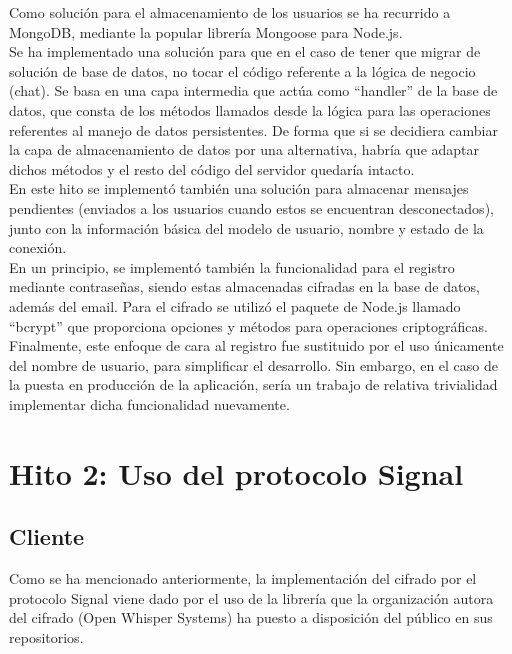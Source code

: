 Como solución para el almacenamiento de los usuarios se ha recurrido a MongoDB, mediante la popular librería Mongoose para Node.js. \\

Se ha implementado una solución para que en el caso de tener que migrar de solución de base de datos, no tocar el código referente a la lógica de negocio (chat). Se basa en una capa intermedia que actúa como \hyphenquote{spanish}{handler} de la base de datos, que consta de los métodos llamados desde la lógica para las operaciones referentes al manejo de datos persistentes. De forma que si se decidiera cambiar la capa de almacenamiento de datos por una alternativa, habría que adaptar dichos métodos y el resto del código del servidor quedaría intacto. \\ 

En este hito se implementó también una solución para almacenar mensajes pendientes (enviados a los usuarios cuando estos se encuentran desconectados), junto con la información básica del modelo de usuario, nombre y estado de la conexión. \\

En un principio, se implementó también la funcionalidad para el registro mediante contraseñas, siendo estas almacenadas cifradas en la base de datos, además del email. Para el cifrado se utilizó el paquete de Node.js llamado \hyphenquote{spanish}{bcrypt} que proporciona opciones y métodos para operaciones criptográficas. Finalmente, este enfoque de cara al registro fue sustituido por el uso únicamente del nombre de usuario, para simplificar el desarrollo. Sin embargo, en el caso de la puesta en producción de la aplicación, sería un trabajo de relativa trivialidad implementar dicha funcionalidad nuevamente. \\

\section{Hito 2: Uso del protocolo Signal}

\subsection{Cliente}

Como se ha mencionado anteriormente, la implementación del cifrado por el protocolo Signal viene dado por el uso de la librería que la organización autora del cifrado (Open Whisper Systems) ha puesto a disposición del público en sus repositorios. \\ 

